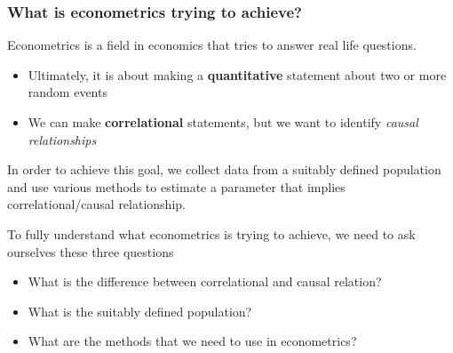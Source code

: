 \documentclass[aspectratio=169]{beamer}
\newenvironment{wideitemize}{\itemize\addtolength{\itemsep}{10pt}}{\enditemize}
\begin{document}
\begin{frame}
\frametitle{What is econometrics trying to achieve?}
\begin{wideitemize}
\item Econometrics is a field in economics that tries to answer real life questions.  
\begin{itemize}
\item Ultimately, it is about making a \textbf{quantitative} statement about two or more random events
\item We can make \textbf{correlational} statements, but we want to identify \textit{causal relationships}
\end{itemize}
\item In order to achieve this goal, we collect data from a suitably defined population and use various methods to estimate a parameter that implies correlational/causal relationship.
\item To fully understand what econometrics is trying to achieve, we need to ask ourselves these three questions
\begin{itemize}
\item  What is the difference between correlational and causal relation? 
\item What is the suitably defined population? 
\item What are the methods that we need to use in econometrics?
\end{itemize}
 \end{wideitemize}
\end{frame}
\end{document}
